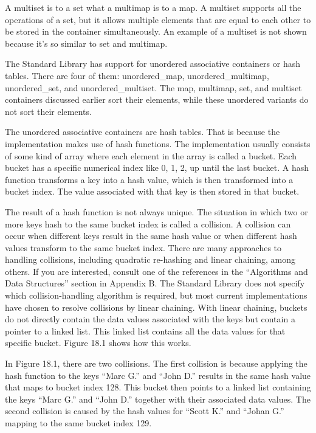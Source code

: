 
A multiset is to a set what a multimap is to a map. A multiset supports all the operations of a set, but it allows multiple elements that are equal to each other to be stored in the container simultaneously. An example of a multiset is not shown because it’s so similar to set and multimap.


The Standard Library has support for unordered associative containers or hash tables. There are four of them: unordered\_map, unordered\_multimap, unordered\_set, and unordered\_multiset. The map, multimap, set, and multiset containers discussed earlier sort their elements, while these unordered variants do not sort their elements.


The unordered associative containers are hash tables. That is because the implementation makes use of hash functions. The implementation usually consists of some kind of array where each element in the array is called a bucket. Each bucket has a specific numerical index like 0, 1, 2, up until the last bucket. A hash function transforms a key into a hash value, which is then transformed into a bucket index. The value associated with that key is then stored in that bucket.

The result of a hash function is not always unique. The situation in which two or more keys hash to the same bucket index is called a collision. A collision can occur when different keys result in the same hash value or when different hash values transform to the same bucket index. There are many approaches to handling collisions, including quadratic re-hashing and linear chaining, among others. If you are interested, consult one of the references in the “Algorithms and Data Structures” section in Appendix B. The Standard Library does not specify which collision-handling algorithm is required, but most current implementations have chosen to resolve collisions by linear chaining. With linear chaining, buckets do not directly contain the data values associated with the keys but contain a pointer to a linked list. This linked list contains all the data values for that specific bucket. Figure 18.1 shows how this works.


In Figure 18.1, there are two collisions. The first collision is because applying the hash function to the keys “Marc G.” and “John D.” results in the same hash value that maps to bucket index 128. This bucket then points to a linked list containing the keys “Marc G.” and “John D.” together with their associated data values. The second collision is caused by the hash values for “Scott K.” and “Johan G.” mapping to the same bucket index 129.

